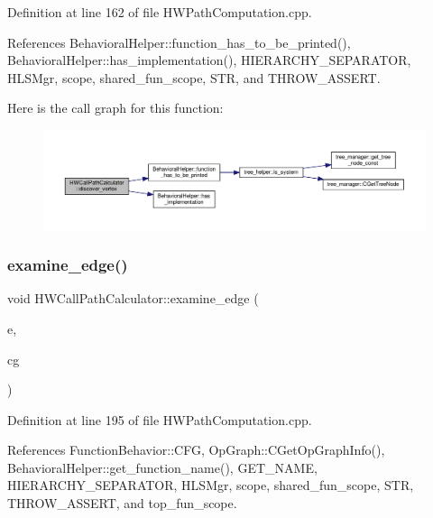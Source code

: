 Definition at line 162 of file H\+W\+Path\+Computation.\+cpp.



References Behavioral\+Helper\+::function\+\_\+has\+\_\+to\+\_\+be\+\_\+printed(), Behavioral\+Helper\+::has\+\_\+implementation(), H\+I\+E\+R\+A\+R\+C\+H\+Y\+\_\+\+S\+E\+P\+A\+R\+A\+T\+OR, H\+L\+S\+Mgr, scope, shared\+\_\+fun\+\_\+scope, S\+TR, and T\+H\+R\+O\+W\+\_\+\+A\+S\+S\+E\+RT.

Here is the call graph for this function\+:
\nopagebreak
\begin{figure}[H]
\begin{center}
\leavevmode
\includegraphics[width=350pt]{da/d67/classHWCallPathCalculator_a53001ec23cdf7629228bbca0cb46750f_cgraph}
\end{center}
\end{figure}
\mbox{\label{classHWCallPathCalculator_a907a8d0f033b3d51c8499ffcd4070bc3}} 
\subsubsection{\texorpdfstring{examine\+\_\+edge()}{examine\_edge()}}
{\footnotesize\ttfamily void H\+W\+Call\+Path\+Calculator\+::examine\+\_\+edge (\begin{DoxyParamCaption}\item[{const \hyperlink{graph_8hpp_a9eb9afea34e09f484b21f2efd263dd48}{Edge\+Descriptor} \&}]{e,  }\item[{const \hyperlink{classUnfoldedCallGraph}{Unfolded\+Call\+Graph} \&}]{cg }\end{DoxyParamCaption})}



Definition at line 195 of file H\+W\+Path\+Computation.\+cpp.



References Function\+Behavior\+::\+C\+FG, Op\+Graph\+::\+C\+Get\+Op\+Graph\+Info(), Behavioral\+Helper\+::get\+\_\+function\+\_\+name(), G\+E\+T\+\_\+\+N\+A\+ME, H\+I\+E\+R\+A\+R\+C\+H\+Y\+\_\+\+S\+E\+P\+A\+R\+A\+T\+OR, H\+L\+S\+Mgr, scope, shared\+\_\+fun\+\_\+scope, S\+TR, T\+H\+R\+O\+W\+\_\+\+A\+S\+S\+E\+RT, and top\+\_\+fun\+\_\+scope.

